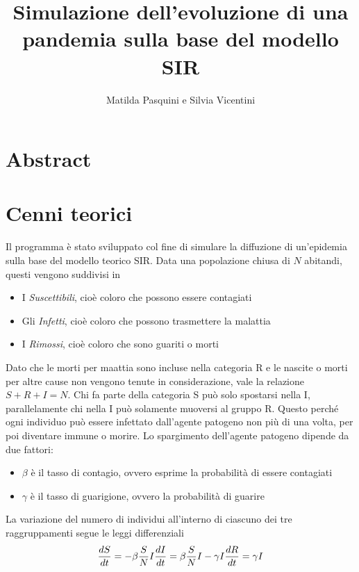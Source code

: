 \documentclass[12pt, a4paper]{article} %
\title{Simulazione dell'evoluzione di una pandemia sulla base del modello SIR}
\author{Matilda Pasquini e Silvia Vicentini}
\begin{document}
\maketitle
\section{Abstract}

\section{Cenni teorici}
Il programma \`{e} stato sviluppato col fine di simulare la diffuzione di un'epidemia sulla base del modello teorico SIR. Data una popolazione chiusa di $N$ abitandi, questi vengono suddivisi in
\begin{itemize}
\item I \textit{Suscettibili}, cio\`{e} coloro che possono essere contagiati
\item Gli \textit{Infetti}, cio\`{e} coloro che possono trasmettere la malattia
\item I \textit{Rimossi}, cio\`{e} coloro che sono guariti o morti
\end{itemize}
Dato che le morti per maattia sono incluse nella categoria R e le nascite o morti per altre cause non vengono tenute in considerazione, vale la relazione $S+R+I=N$. Chi fa parte della categoria S pu\`{o} solo spostarsi nella I, parallelamente chi nella I pu\`{o} solamente muoversi al gruppo R. Questo perch\'e ogni individuo pu\`{o} essere infettato dall'agente patogeno non pi\`{u} di una volta, per poi diventare immune o morire. 
Lo spargimento dell'agente patogeno dipende da due fattori:
\begin{itemize}
\item \textit{$\beta$} \`{e} il tasso di contagio, ovvero esprime la probabilit\`{a} di essere contagiati

\item \textit{$\gamma$} \`{e} il tasso di guarigione, ovvero la probabilit\`{a} di guarire
\end{itemize}
La variazione del numero di individui all'interno di ciascuno dei tre raggruppamenti segue le leggi differenziali
\begin{equation}
\frac{dS}{dt} = -\beta \frac{S}{N}I \\
\frac{dI}{dt} = \beta \frac{S}{N}I-\gamma I  \\ %
\frac{dR}{dt} = \gamma I \\
\end{equation}
\end{document}
